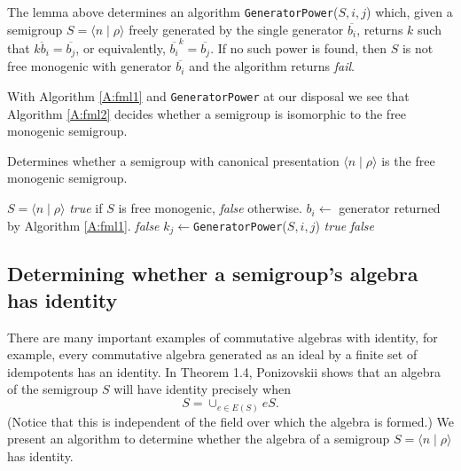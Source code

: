 \documentclass{acmconf}
\begin{document}
The lemma above determines an algorithm {\tt GeneratorPower}($S,i, j$)
which, given a semigroup $S = \langle n \mid \rho \rangle$
freely generated by the single generator $\overline{b_i}$, returns $k$ such
that $\overline{kb_i} = \overline{b_j}$, or equivalently,
$\overline{b_i}^k = \overline{b_j}$. If no such power is found, then
$S$ is not free monogenic with generator $\overline{b_i}$ and the algorithm 
returns \emph{fail}.


With Algorithm  \ref{A:fml1} and {\tt GeneratorPower} at our disposal 
we see that Algorithm \ref{A:fml2} decides whether  a semigroup is
isomorphic to the free monogenic semigroup.
\begin{algorithm}
\caption{Determines whether a semigroup with canonical presentation
$\langle n \mid \rho \rangle$ is the free monogenic semigroup.}
\label{A:fml2}
\begin{algorithmic}[1]
\REQUIRE $S = \langle n \mid \rho \rangle$  
\ENSURE \emph{true} if $S$ is free monogenic, \emph{false} otherwise.
\ELSE
        \STATE $b_i \leftarrow $ generator returned by Algorithm \ref{A:fml1}.
\ENDIF
{}
                 \emph{false}
        \ELSE
                \STATE $k_j \leftarrow ${\tt GeneratorPower}($S,i, j$)
        \ENDIF
\ENDFOR
\STATE {}
         \emph{true}
\ELSE
         \emph{false}
\ENDIF
\end{algorithmic}
\end{algorithm}


\subsection{Determining whether a semigroup's algebra has identity}
There are many important examples of commutative algebras with
identity, for example, every commutative algebra generated as an ideal 
by a finite set of idempotents has an identity.
In \cite{poniz87} Theorem 1.4, Ponizovskii shows that an algebra 
of the semigroup $S$ will have identity precisely when 
\begin{equation}\label{eq:hasid}
S = \cup_{e \in E(S)}eS.
\end{equation}
(Notice that this is independent of the 
field over which the algebra is formed.)
We present an algorithm to determine whether
the algebra of a semigroup $S = \langle n \mid \rho\rangle$ has 
identity.
\end{document}
